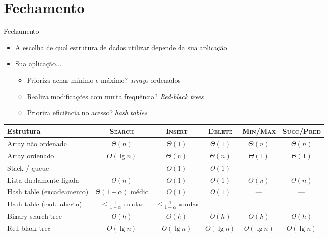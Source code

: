 \documentclass[aspectratio=169,10pt]{beamer}
\newcommand{\proc}[1]{\textnormal{\rmfamily\textsc{#1}}}
\begin{document}
\section{Fechamento}

\begin{frame}{Fechamento}
  \centering\small
  \begin{itemize}
    \item A escolha de qual estrutura de dados utilizar depende da sua aplicação
    \item Sua aplicação... 
    \begin{itemize}
      \item Prioriza achar mínimo e máximo? \textit{arrays} ordenados
      \item Realiza modificações com muita frequência? \textit{Red-black trees}
      \item Prioriza eficiência no acesso? \textit{hash tables}
    \end{itemize}
  \end{itemize}
  \begin{tabular}{@{}lccccc@{}}
    \toprule
    Estrutura & \proc{Search} & \proc{Insert} & \proc{Delete} & \proc{Min}/\proc{Max} & \proc{Succ}/\proc{Pred} \\
    \midrule
    Array não ordenado         & $\Theta(n)$ & $\Theta(1)$ & $\Theta(1)$ & $\Theta(n)$ & $\Theta(n)$ \\
    Array ordenado             & $O(\lg n)$  & $\Theta(n)$ & $\Theta(n)$ & $\Theta(1)$ & $\Theta(1)$ \\
    Stack / queue              & ---         & $O(1)$      & $O(1)$      & ---         & --- \\
    Lista duplamente ligada    & $\Theta(n)$ & $O(1)$      & $O(1)$      & $\Theta(n)$ & $\Theta(n)$ \\
    Hash table (encadeamento)  & $\Theta(1+\alpha)$ médio & $O(1)$ & $O(1)$ & --- & --- \\
    Hash table (end.\ aberto)  & $\le \frac{1}{1-\alpha}$ sondas & $\le \frac{1}{1-\alpha}$ sondas & --- & --- & --- \\
    Binary search tree         & $O(h)$ & $O(h)$ & $O(h)$ & $O(h)$ & $O(h)$ \\
    Red-black tree             & $O(\lg n)$ & $O(\lg n)$ & $O(\lg n)$ & $O(\lg n)$ & $O(\lg n)$ \\
    \bottomrule
  \end{tabular}

\end{frame}
\end{document}

